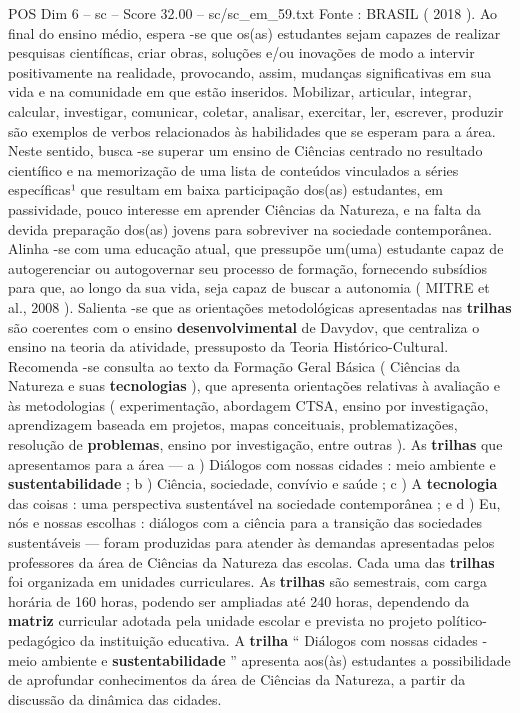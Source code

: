\begin{textsample}{POS Dim 6 – sc – Score 32.00 – sc/sc\_em\_59.txt}
Fonte : BRASIL ( 2018 ).
Ao final do ensino médio, espera -se que os(as) estudantes sejam capazes de realizar pesquisas científicas, criar obras, soluções e/ou inovações de modo a intervir positivamente na realidade, provocando, assim, mudanças significativas em sua vida e na comunidade em que estão inseridos.
Mobilizar, articular, integrar, calcular, investigar, comunicar, coletar, analisar, exercitar, ler, escrever, produzir são exemplos de verbos relacionados às habilidades que se esperam para a área.
Neste sentido, busca -se superar um ensino de Ciências centrado no resultado científico e na memorização de uma lista de conteúdos vinculados a séries específicas¹ que resultam em baixa participação dos(as) estudantes, em passividade, pouco interesse em aprender Ciências da Natureza, e na falta da devida preparação dos(as) jovens para sobreviver na sociedade contemporânea.
Alinha -se com uma educação atual, que pressupõe um(uma) estudante capaz de autogerenciar ou autogovernar seu processo de formação, fornecendo subsídios para que, ao longo da sua vida, seja capaz de buscar a autonomia ( MITRE et al., 2008 ).
Salienta -se que as orientações metodológicas apresentadas nas \textbf{trilhas} são coerentes com o ensino \textbf{desenvolvimental} de Davydov, que centraliza o ensino na teoria da atividade, pressuposto da Teoria Histórico-Cultural.
Recomenda -se consulta ao texto da Formação Geral Básica ( Ciências da Natureza e suas \textbf{tecnologias} ), que apresenta orientações relativas à avaliação e às metodologias ( experimentação, abordagem CTSA, ensino por investigação, aprendizagem baseada em projetos, mapas conceituais, problematizações, resolução de \textbf{problemas}, ensino por investigação, entre outras ).
As \textbf{trilhas} que apresentamos para a área — a ) Diálogos com nossas cidades : meio ambiente e \textbf{sustentabilidade} ; b ) Ciência, sociedade, convívio e saúde ; c ) A \textbf{tecnologia} das coisas : uma perspectiva sustentável na sociedade contemporânea ; e d ) Eu, nós e nossas escolhas : diálogos com a ciência para a transição das sociedades sustentáveis — foram produzidas para atender às demandas apresentadas pelos professores da área de Ciências da Natureza das escolas.
Cada uma das \textbf{trilhas} foi organizada em unidades curriculares.
As \textbf{trilhas} são semestrais, com carga horária de 160 horas, podendo ser ampliadas até 240 horas, dependendo da \textbf{matriz} curricular adotada pela unidade escolar e prevista no projeto político-pedagógico da instituição educativa.
A \textbf{trilha} “ Diálogos com nossas cidades - meio ambiente e \textbf{sustentabilidade} ” apresenta aos(às) estudantes a possibilidade de aprofundar conhecimentos da área de Ciências da Natureza, a partir da discussão da dinâmica das cidades.

\end{textsample}
